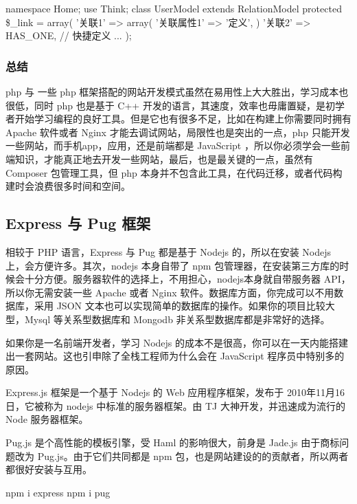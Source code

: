 \begin{code}
namespace Home\Model;
use Think\Model\RelationModel;
class UserModel extends RelationModel{
    protected \$_link = array(
         '关联1'  =>  array(
             '关联属性1' => '定义',
         )
         '关联2'  =>  HAS_ONE, // 快捷定义
         ...
    );
}
\end{code}

\subsubsection{总结}

php 与 一些 php 框架搭配的网站开发模式虽然在易用性上大大胜出，学习成本也很低，同时 php 也是基于 C++ 开发的语言，其速度，效率也毋庸置疑，是初学者开始学习编程的良好工具。但是它也有很多不足，比如在构建上你需要同时拥有 Apache 软件或者 Nginx 才能去调试网站，局限性也是突出的一点，php 只能开发一些网站，而手机app，应用，还是前端都是 JavaScript ，所以你必须学会一些前端知识，才能真正地去开发一些网站，最后，也是最关键的一点，虽然有 Composer 包管理工具，但 php 本身并不包含此工具，在代码迁移，或者代码构建时会浪费很多时间和空间。

\subsection{Express 与 Pug 框架}

相较于 PHP 语言，Express 与 Pug 都是基于 Nodejs 的，所以在安装 Nodejs 上，会方便许多。其次，nodejs 本身自带了 npm 包管理器，在安装第三方库的时候会十分方便。服务器软件的选择上，不用担心，nodejs本身就自带服务器 API，所以你无需安装一些 Apache 或者 Nginx 软件。数据库方面，你完成可以不用数据库，采用 JSON 文本也可以实现简单的数据库的操作。如果你的项目比较大型，Mysql 等关系型数据库和 Mongodb 非关系型数据库都是非常好的选择。

如果你是一名前端开发者，学习 Nodejs 的成本不是很高，你可以在一天内能搭建出一套网站。这也引申除了全栈工程师为什么会在 JavaScript 程序员中特别多的原因。

Express.js 框架是一个基于 Nodejs 的 Web 应用程序框架，发布于 2010年11月16日，它被称为 nodejs 中标准的服务器框架。由 TJ 大神开发，并迅速成为流行的 Node 服务器框架。

Pug.js 是个高性能的模板引擎，受 Haml 的影响很大，前身是 Jade.js 由于商标问题改为 Pug.js。由于它们共同都是 npm 包，也是网站建设的的贡献者，所以两者都很好安装与互用。

\begin{code}
npm i express
npm i pug
\end{code}

